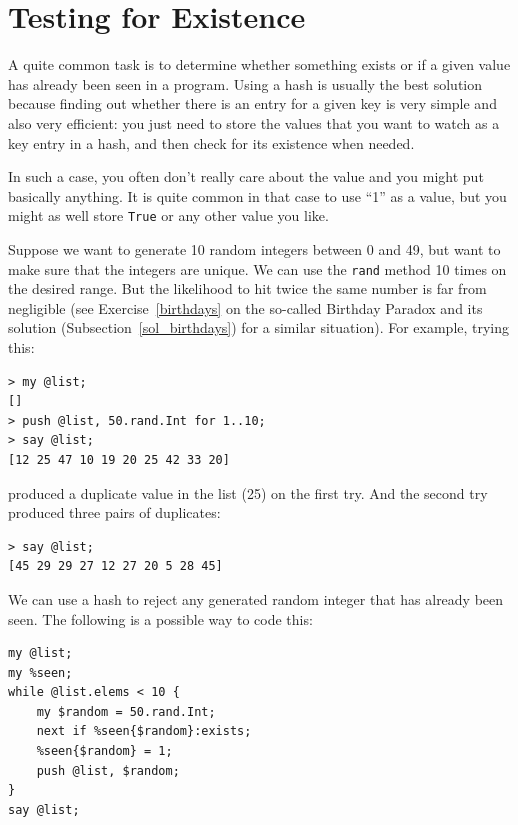 \section{Testing for Existence}

A quite common task is to determine whether something exists or 
if a given value has already been seen in a program. Using a 
hash is usually the best solution because finding out whether 
there is an entry for a given key is very simple and also 
very efficient: you just need to store the values that you 
want to watch as a key entry in a hash, and then check for 
its existence when needed.

In such a case, you often don't really 
care about the value and you might put basically anything. 
It is quite common in that case to use ``1'' as a value, but 
you might as well store {\tt True} or any other value you 
like.

Suppose we want to generate 10 random integers between 0 and 
49, but want to make sure that the integers are unique. We 
can use the {\tt rand} method 10 times on the desired range. But 
the likelihood to hit twice the same number is far from 
negligible (see Exercise~\ref{birthdays} on the so-called 
Birthday Paradox and its solution (Subsection~\ref{sol_birthdays}) 
for a similar situation). For example, trying this:

\begin{verbatim}
> my @list;
[]
> push @list, 50.rand.Int for 1..10;
> say @list;
[12 25 47 10 19 20 25 42 33 20]
\end{verbatim}

produced a duplicate value in the list (25) on the first try.
And the second try produced three pairs of duplicates:

\begin{verbatim}
> say @list;
[45 29 29 27 12 27 20 5 28 45]
\end{verbatim}

We can use a hash to reject any generated random integer 
that has already been seen. The following is a possible way to 
code this:

\begin{verbatim}
my @list;
my %seen;
while @list.elems < 10 {
    my $random = 50.rand.Int;
    next if %seen{$random}:exists;
    %seen{$random} = 1;
    push @list, $random;
}
say @list;
\end{verbatim}

